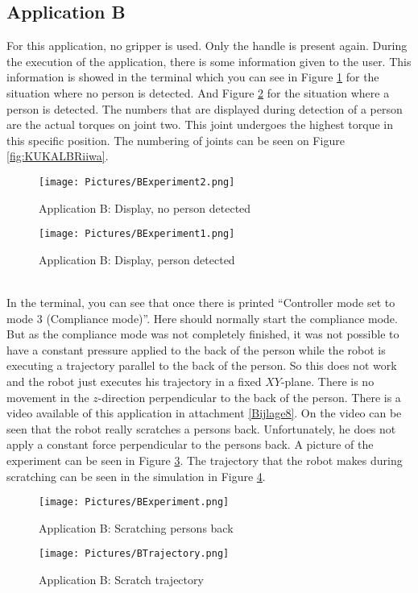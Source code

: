 \documentclass[11pt,a4paper]{report}
\begin{document}
\subsection{Application B}
For this application, no gripper is used. Only the handle is present again. During the execution of the application, there is some information given to the user. This information is showed in the terminal which you can see in Figure \ref{fig:BExperiment2} for the situation where no person is detected. And Figure \ref{fig:BExperiment1} for the situation where a person is detected. The numbers that are displayed during detection of a person are the actual torques on joint two. This joint undergoes the highest torque in this specific position. The numbering of joints can be seen on Figure \ref{fig:KUKALBRiiwa}. \\
\begin{figure}[!ht]
	\centering
	\texttt{[image: Pictures/BExperiment2.png]}
	\caption{Application B: Display, no person detected}
	\label{fig:BExperiment2}
\end{figure}
\begin{figure}[!ht]
	\centering
	\texttt{[image: Pictures/BExperiment1.png]}
	\caption{Application B: Display, person detected}
	\label{fig:BExperiment1}
\end{figure}\\
In the terminal, you can see that once there is printed ``Controller mode set to mode 3 (Compliance mode)''. Here should normally start the compliance mode. But as the compliance mode was not completely finished, it was not possible to have a constant pressure applied to the back of the person while the robot is executing a trajectory parallel to the back of the person. So this does not work and the robot just executes his trajectory in a fixed $XY$-plane. There is no movement in the $z$-direction perpendicular to the back of the person.\newpage
There is a video available of this application in attachment \ref{Bijlage8}. On the video can be seen that the robot really scratches a persons back. Unfortunately, he does not apply a constant force perpendicular to the persons back.
A picture of the experiment can be seen in Figure \ref{fig:BExperiment}. The trajectory that the robot makes during scratching can be seen in the simulation in Figure \ref{fig:BTrajectory}.
\begin{figure}[!ht]
	\centering
	\texttt{[image: Pictures/BExperiment.png]}
	\caption{Application B: Scratching persons back}
	\label{fig:BExperiment}
\end{figure}
\begin{figure}[!ht]
	\centering
	\texttt{[image: Pictures/BTrajectory.png]}
	\caption{Application B: Scratch trajectory}
	\label{fig:BTrajectory}
\end{figure}\\
\newpage
\end{document}

